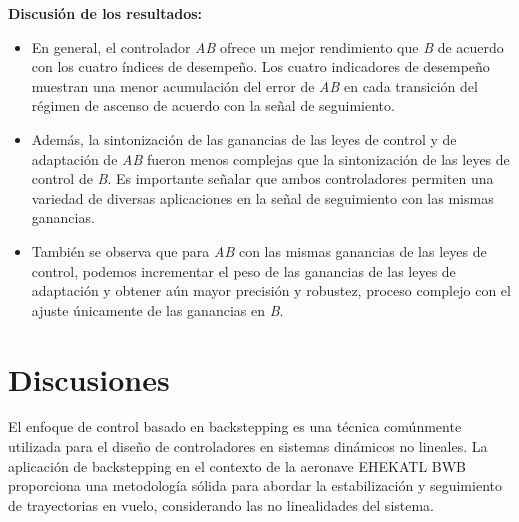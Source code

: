 \bigskip

\textbf{Discusión de los resultados:}
\begin{itemize}
    \item En general, el controlador \textit{AB} ofrece un mejor rendimiento que \textit{B} de acuerdo con los cuatro índices de desempeño. 
    Los cuatro indicadores de desempeño muestran una menor acumulación del error de \textit{AB} en cada transición del régimen de ascenso de acuerdo con la señal de seguimiento.
    \item Además, la sintonización de las ganancias de las leyes de control y de adaptación de \textit{AB} fueron menos complejas que la sintonización de las leyes de control de \textit{B}. Es importante señalar que ambos controladores permiten una variedad de diversas aplicaciones en la señal de seguimiento con las mismas ganancias. 
    \item También se observa que para \textit{AB} con las mismas ganancias de las leyes de control, podemos incrementar el peso de las ganancias de las leyes de adaptación y obtener aún mayor precisión y robustez, proceso complejo con el ajuste únicamente de las ganancias en \textit{B}.
\end{itemize}

\section{Discusiones}

El enfoque de control basado en backstepping es una técnica comúnmente utilizada para el diseño de controladores en sistemas dinámicos no lineales. La aplicación de backstepping en el contexto de la aeronave EHEKATL BWB proporciona una metodología sólida para abordar la estabilización y seguimiento de trayectorias en vuelo, considerando las no linealidades del sistema.


